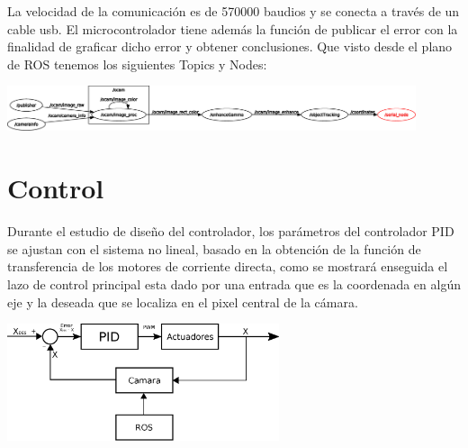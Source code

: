 La velocidad de la comunicación es de 570000 baudios y se conecta a través de un cable usb. El microcontrolador tiene además
la función de publicar el error con la finalidad de graficar dicho error y obtener conclusiones. Que visto desde el plano
de ROS tenemos los siguientes Topics y Nodes:
\begin{center}
	\includegraphics[width=0.9\textwidth]{Contenido/Cuerpo/Capitulo5/Fig3.eps}
	\label{Fig4}
\end{center}


\section{Control}
Durante el estudio de diseño del controlador, los parámetros del controlador PID se ajustan con el sistema no lineal, basado
en la obtención de la función de transferencia de los motores de corriente directa, como se mostrará enseguida el lazo de control
principal esta dado por una entrada que es la coordenada en algún eje y la deseada que se localiza en el pixel central de la
cámara.
\begin{center}
	\includegraphics[width=0.6\textwidth]{Contenido/Cuerpo/Capitulo5/Fig6.eps}
	\label{Fig4}
\end{center}

